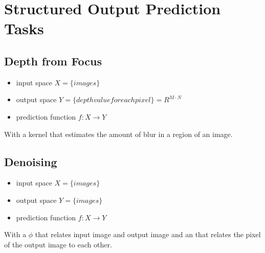 
\section*{Structured Output Prediction Tasks}

\subsection*{Depth from Focus}
\begin{itemize}
    \item input space $X = \{images \}$
    \item output space $Y = \{depth value for each pixel\} = R^{M\cdot N}$
    \item prediction function $f : X \rightarrow Y$
\end{itemize}

With a kernel that estimates the amount of blur in a region of an image.


\subsection*{Denoising} 

\begin{itemize}
    \item input space $X = \{images \}$
    \item output space $Y = \{images \}$
    \item prediction function $f : X \rightarrow Y$
\end{itemize}

With a $\phi$ that relates input image and output image and an \phi that relates the pixel of the output image to each other.
